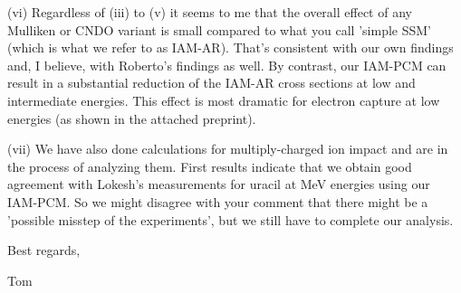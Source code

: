 (vi) Regardless of (iii) to (v) it seems to me that the overall effect
of any Mulliken or CNDO variant is small compared to what you call
'simple SSM' (which is what we refer to as IAM-AR). That's consistent
with our own findings and, I believe, with Roberto's findings as well.
By contrast, our IAM-PCM can result in a substantial reduction of the
IAM-AR cross sections at low and intermediate energies. This effect is
most dramatic for electron capture at low energies (as shown in the
attached preprint).

(vii) We have also done calculations for multiply-charged ion impact and
are in the process of analyzing them. First results indicate that we
obtain good agreement with Lokesh's measurements for uracil at MeV
energies using our IAM-PCM. So we might disagree with your comment that
there might be a 'possible misstep of the experiments', but we still
have to complete our analysis.

Best regards,

Tom

